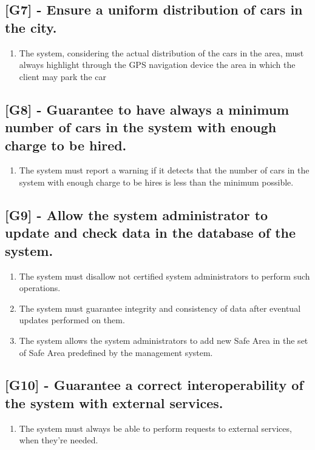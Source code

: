 \subsection{[G7] - Ensure a uniform distribution of cars in the city.}
\begin{enumerate}[label=\textbf{R7.\arabic*)}]
\item The system, considering the actual distribution of the cars in the area, must always highlight through the GPS navigation device the area in which the client may park the car
\end{enumerate}

\subsection{[G8] - Guarantee to have always a minimum number of cars in the system with enough charge to be hired.}
\begin{enumerate}[label=\textbf{R8.\arabic*)}]
\item The system must report a warning if it detects that the number of cars in the system with enough charge to be hires is less than the minimum possible.
\end{enumerate}

\subsection{[G9] - Allow the system administrator to update and check data in the database of the system.}
\begin{enumerate}[label=\textbf{R9.\arabic*)}]
\item The system must disallow not certified system administrators to perform such operations.
\item The system must guarantee integrity and consistency of data after eventual updates performed on them.
\item The system allows the system administrators to add new Safe Area in the set of Safe Area predefined by the management system.
\end{enumerate}

\subsection{[G10] - Guarantee a correct interoperability of the system with external services.}
\begin{enumerate}[label=\textbf{R10.\arabic*)}]
\item The system must always be able to perform requests to external services, when they’re needed.
\end{enumerate}

